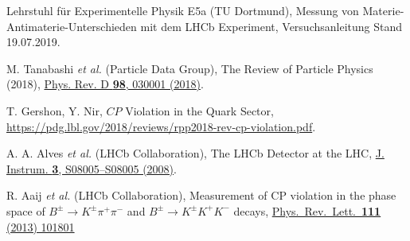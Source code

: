 \begin{thebibliography}{99}
  Lehrstuhl für Experimentelle Physik E5a (TU Dortmund),
  Messung von Materie-Antimaterie-Unterschieden mit dem LHCb Experiment,
  Versuchsanleitung Stand 19.07.2019.

  M. Tanabashi \textit{et al.} (Particle Data Group),
  The Review of Particle Physics (2018),
  \href{https://journals.aps.org/prd/abstract/10.1103/PhysRevD.98.030001}
  {Phys. Rev. D \textbf{98}, 030001 (2018)}.

  T. Gershon, Y. Nir,
  $CP$ Violation in the Quark Sector,
  \url{https://pdg.lbl.gov/2018/reviews/rpp2018-rev-cp-violation.pdf}.

  A. A. Alves \textit{et al.} (LHCb Collaboration),
  The LHCb Detector at the LHC,
  \href{https://doi.org/10.1088%2F1748-0221%2F3%2F08%2Fs08005}
  {J. Instrum. \textbf{3}, S08005--S08005 (2008)}.

  R. Aaij \textit{et al.} (LHCb Collaboration),
  Measurement of CP violation in the phase space of $B^{\pm} \to K^{\pm} \pi^{+} \pi^{-}$ and $B^{\pm} \to K^{\pm} K^{+} K^{-}$ decays,
  \href{  %%CITATION = doi:10.1103/PhysRevLett.111.101801;%%}
  {Phys.\ Rev.\ Lett.\  {\bf 111} (2013) 101801}

\end{thebibliography}
